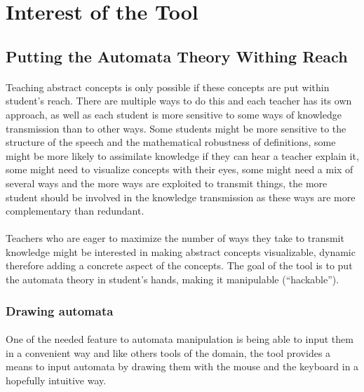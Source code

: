 \documentclass{article}
\begin{document}
\tableofcontents
\begin{sloppypar}


\section{ Interest of the Tool}



\subsection{ Putting the Automata Theory Withing Reach}


\paragraph{}
Teaching abstract concepts is only possible if these concepts are put within student's reach. There are multiple ways to do this and each teacher has its own approach, as well as each student is more sensitive to some ways of knowledge transmission than to other ways. Some students might be more sensitive to the structure of the speech and the mathematical robustness of definitions, some might be more likely to assimilate knowledge if they can hear a teacher explain it, some might need to visualize concepts with their eyes, some might need a mix of several ways and the more ways are exploited to transmit things, the more student should be involved in the knowledge transmission as these ways are more complementary than redundant.

      
\paragraph{}
Teachers who are eager to maximize the number of ways they take to transmit knowledge might be interested in making abstract concepts visualizable, dynamic therefore adding a concrete aspect of the concepts. The goal of the tool is to put the automata theory in student's hands, making it manipulable (``hackable'').
      
      

\subsubsection{ Drawing automata}


\paragraph{}
One of the needed feature to automata manipulation is being able to input them in a convenient way and like others tools of the domain, the tool provides a means to input automata by drawing them with the mouse and the keyboard in a hopefully intuitive way.


\end{sloppypar}
\end{document}
